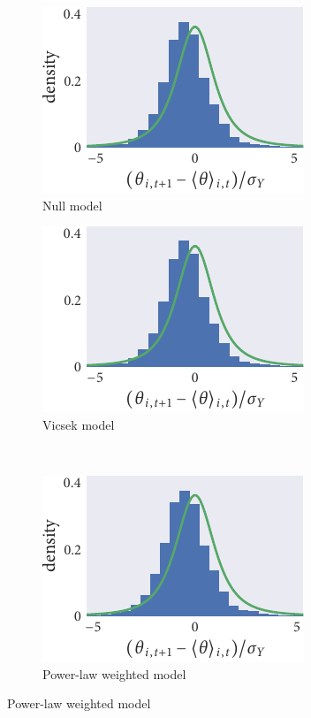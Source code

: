 \begin{figure}[tbp]
  \begin{subfigure}[t]{0.33333\textwidth}
    \caption{Null model}
    \includegraphics{seq3/null_residuals.pdf}
  \end{subfigure}\hspace{2pt}
  \begin{subfigure}[t]{0.33333\textwidth}
    \caption{Vicsek model}
    \includegraphics{seq3/r_residuals.pdf}
  \end{subfigure}\vspace{1em}\\
  \begin{subfigure}[t]{0.33333\textwidth}
    \includegraphics{seq3/power_residuals.pdf}
    \caption{Power-law weighted model}

\end{subfigure}
\end{figure}
